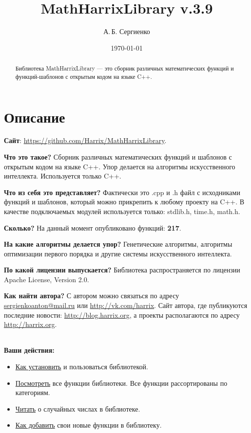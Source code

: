 \documentclass[a4paper,12pt]{article}
\title{MathHarrixLibrary v.3.9}
\author{А.\,Б. Сергиенко}
\date{\today}
\begin{document}


\maketitle

\begin{abstract}
Библиотека MathHarrixLibrary --- это сборник различных математических функций и функций-шаблонов с открытым кодом на языке C++.
\end{abstract}

\tableofcontents

\newpage

\section{Описание}

\textbf{Сайт}: \href{https://github.com/Harrix/MathHarrixLibrary}{https://github.com/Harrix/MathHarrixLibrary}.

\textbf{Что это такое?} Сборник различных математических функций и шаблонов с открытым кодом на языке C++. Упор делается на алгоритмы искусственного интеллекта. Используется только C++.

\textbf{Что из себя это представляет?} Фактически это .cpp и .h файл с исходниками функций и шаблонов, который можно прикрепить к любому проекту на C++. В качестве подключаемых модулей используется только: stdlib.h, time.h, math.h.

\textbf{Сколько?} На данный момент опубликовано функций: \textbf{217}.

\textbf{На какие алгоритмы делается упор?} Генетические алгоритмы, алгоритмы оптимизации первого порядка и другие системы искусственного интеллекта.

\textbf{По какой лицензии выпускается?} Библиотека распространяется по лицензии Apache License, Version 2.0.

\textbf{Как найти автора?} С автором можно связаться по адресу \href {mailto:sergienkoanton@mail.ru} {sergienkoanton@mail.ru} или  \href {http://vk.com/harrix} {http://vk.com/harrix}. Сайт автора, где публикуются последние новости: \href {http://blog.harrix.org} {http://blog.harrix.org}, а проекты располагаются по адресу \href {http://harrix.org} {http://harrix.org}.

~\\

\textbf{Ваши действия:}

\begin{itemize}
\item \hyperref[section_install]{Как установить} и пользоваться библиотекой.
\item \hyperref[section_listfunctions]{Посмотреть} все функции библиотеки. Все функции рассортированы по категориям.
\item \hyperref[section_random]{Читать} о случайных числах в библиотеке.
\item \hyperref[section_addnew]{Как добавить} свои новые функции в библиотеку.
\end{itemize}
\end{document}
